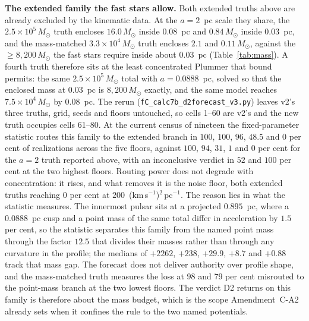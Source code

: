 \documentclass[11pt]{article}
\newcommand{\msun}{\ensuremath{M_\odot}}
\begin{document}
\textbf{The extended family the fast stars allow.} Both extended truths above are already excluded by the kinematic data. At the $a = 2$~pc scale they share, the $2.5\times10^{5}\,\msun$ truth encloses $16.0\,\msun$ inside $0.08$~pc and $0.84\,\msun$ inside $0.03$~pc, and the mass-matched $3.3\times10^{4}\,\msun$ truth encloses $2.1$ and $0.11\,\msun$, against the $\geq 8{,}200\,\msun$ the fast stars require inside about $0.03$~pc (Table~\ref{tab:mass}). A fourth truth therefore sits at the least concentrated Plummer that bound permits: the same $2.5\times10^{5}\,\msun$ total with $a = 0.0888$~pc, solved so that the enclosed mass at $0.03$~pc is $8{,}200\,\msun$ exactly, and the same model reaches $7.5\times10^{4}\,\msun$ by $0.08$~pc. The rerun (\texttt{fC\_calc7b\_d2forecast\_v3.py}) leaves v2's three truths, grid, seeds and floors untouched, so cells 1--60 are v2's and the new truth occupies cells 61--80. At the current census of nineteen the fixed-parameter statistic routes this family to the extended branch in $100$, $100$, $96$, $48.5$ and $0$ per cent of realizations across the five floors, against $100$, $94$, $31$, $1$ and $0$ per cent for the $a = 2$ truth reported above, with an inconclusive verdict in $52$ and $100$ per cent at the two highest floors. Routing power does not degrade with concentration: it rises, and what removes it is the noise floor, both extended truths reaching $0$ per cent at $200$~(km\,s$^{-1}$)$^{2}$\,pc$^{-1}$. The reason lies in what the statistic measures. The innermost pulsar sits at a projected $0.895$~pc, where a $0.0888$~pc cusp and a point mass of the same total differ in acceleration by $1.5$ per cent, so the statistic separates this family from the named point mass through the factor $12.5$ that divides their masses rather than through any curvature in the profile; the medians of $+2262$, $+238$, $+29.9$, $+8.7$ and $+0.88$ track that mass gap. The forecast does not deliver authority over profile shape, and the mass-matched truth measures the loss at $98$ and $79$ per cent misrouted to the point-mass branch at the two lowest floors. The verdict D2 returns on this family is therefore about the mass budget, which is the scope Amendment~C-A2 already sets when it confines the rule to the two named potentials.
\end{document}
